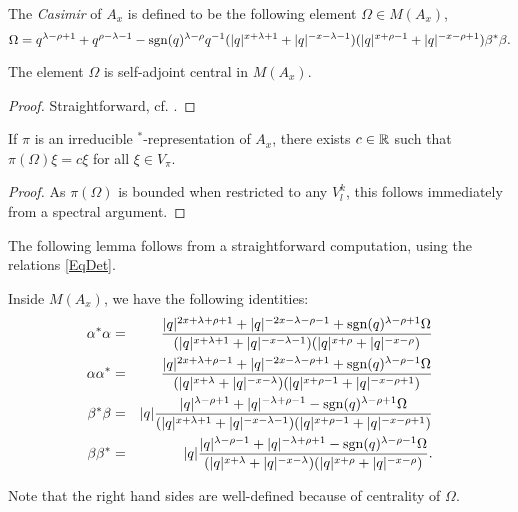 \begin{Def} The \emph{Casimir} of $A_x$ is defined to be the following element $\Omega\in M(A_x)$, \[\Omega =q^{\lambda-\rho+1}+q^{\rho-\lambda-1} - \operatorname{\mathrm{sgn}}(q)^{\lambda-\rho}q^{-1}(|q|^{x+\lambda+1}+|q|^{-x-\lambda-1})(|q|^{x+\rho-1}+|q|^{-x-\rho+1})\beta^*\beta.\] 
\end{Def}

\begin{Lem} The element $\Omega$ is  self-adjoint central in $M(A_x)$.
\end{Lem}
\begin{proof}
Straightforward, cf. \cite[Lemma 3.3]{KoR1}.
\end{proof}

\begin{Cor}\label{CorCas} If $\pi$ is an irreducible $^*$-representation of $A_x$, there exists $c\in \mathbb{R}$ such that $\pi(\Omega)\xi = c\xi$ for all $\xi \in V_{\pi}$. 
\end{Cor} 
\begin{proof} As $\pi(\Omega)$ is bounded when restricted to any $V^k_l$, this follows immediately from a spectral argument. 
\end{proof} 

The following lemma follows from a straightforward computation, using the relations \eqref{EqDet}.

\begin{Lem}\label{LemAmp} Inside $M(A_x)$, we have the following identities:
\begin{eqnarray*}
\alpha^*\alpha &=& \frac{|q|^{2x+\lambda+\rho+1}+|q|^{-2x-\lambda-\rho-1}+\operatorname{\mathrm{sgn}}(q)^{\lambda-\rho+1}\Omega}{(|q|^{x+\lambda+1}+|q|^{-x-\lambda-1})(|q|^{x+\rho}+|q|^{-x-\rho})}\\
\alpha\alpha^* &=& \frac{|q|^{2x+\lambda+\rho-1}+|q|^{-2x-\lambda-\rho+1}+\operatorname{\mathrm{sgn}}(q)^{\lambda-\rho-1}\Omega}{(|q|^{x+\lambda}+|q|^{-x-\lambda})(|q|^{x+\rho-1}+|q|^{-x-\rho+1})}\\
\beta^*\beta &=& |q|\frac{|q|^{\lambda-\rho+1}+|q|^{-\lambda+\rho-1}-\operatorname{\mathrm{sgn}}(q)^{\lambda-\rho+1}\Omega}{(|q|^{x+\lambda+1}+|q|^{-x-\lambda-1})(|q|^{x+\rho-1}+|q|^{-x-\rho+1})}\\
\beta\beta^* &=&  |q|\frac{|q|^{\lambda-\rho-1}+|q|^{-\lambda+\rho+1}-\operatorname{\mathrm{sgn}}(q)^{\lambda-\rho-1}\Omega}{(|q|^{x+\lambda}+|q|^{-x-\lambda})(|q|^{x+\rho}+|q|^{-x-\rho})}.
\end{eqnarray*}
\end{Lem}

Note that the right hand sides are well-defined because of centrality of $\Omega$.

